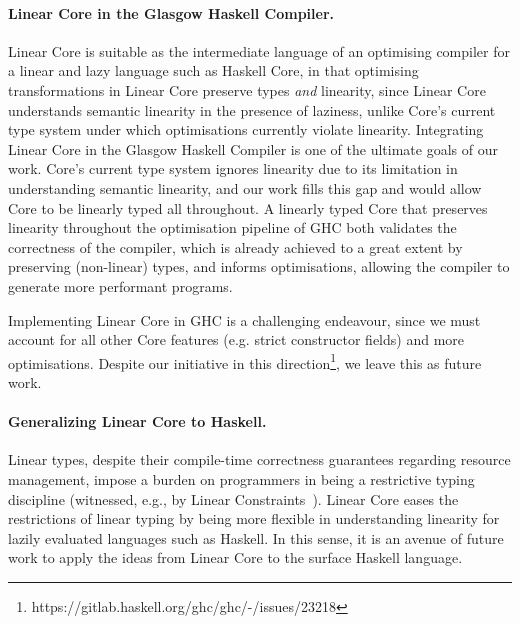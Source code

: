 \documentclass[acmsmall,review]{acmart}
\begin{document}
\paragraph{Linear Core in the Glasgow Haskell Compiler.}
Linear Core is suitable as the intermediate language of an optimising compiler
for a linear and lazy language such as Haskell Core, in that optimising
transformations in Linear Core preserve types \emph{and} linearity, since Linear
Core understands semantic linearity in the presence of laziness, unlike
Core's current type system under which optimisations currently violate
linearity.
%
Integrating Linear Core in the Glasgow Haskell Compiler is one of the ultimate
goals of our work. Core's current type system ignores linearity due to
its limitation in understanding semantic linearity, and our work fills this gap
and would allow Core to be linearly typed all throughout.
%
A linearly typed Core that preserves linearity throughout the optimisation
pipeline of GHC both validates the correctness of the compiler, which is
already achieved to a great extent by preserving (non-linear) types, and
informs optimisations, allowing the compiler to generate more performant programs.

Implementing Linear Core in GHC is a challenging endeavour, since we must account
for all other Core features (e.g. strict constructor fields) and more
optimisations. Despite our initiative in this
direction\footnote{https://gitlab.haskell.org/ghc/ghc/-/issues/23218}, we leave
this as future work.

\paragraph{Generalizing Linear Core to Haskell.}
Linear types, despite their compile-time correctness guarantees regarding
resource management, impose a burden on programmers in being a restrictive
typing discipline (witnessed, e.g., by Linear
Constraints~\cite{cite:linearconstraints}). Linear Core eases the restrictions
of linear typing by being more flexible in understanding linearity for lazily
evaluated languages such as Haskell. In this sense, it is an avenue of future
work to apply the ideas from Linear Core to the surface Haskell language.
\end{document}
